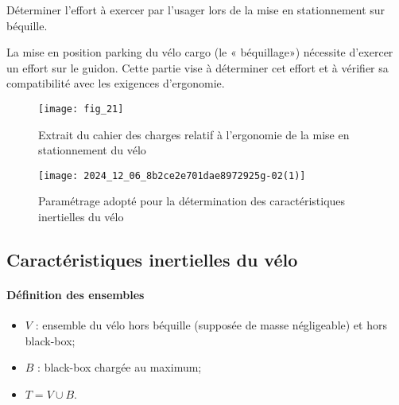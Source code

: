 \begin{obj}
Déterminer l'effort à exercer par l'usager lors de la mise en stationnement sur béquille.
\end{obj}

La mise en position parking du vélo cargo (le « béquillage») nécessite d'exercer un effort sur le guidon. Cette partie vise à déterminer cet effort et à vérifier sa compatibilité avec les exigences d'ergonomie.\\

\begin{figure}[!htb]
\begin{center}
\texttt{[image: fig\_21]}
\caption{Extrait du cahier des charges relatif à l'ergonomie de la mise en stationnement du vélo\\ \label{fig2.1}}
\end{center}
\end{figure}

\begin{figure}[!htb]
\begin{center}
\texttt{[image: 2024\_12\_06\_8b2ce2e701dae8972925g-02(1)]}
\caption{Paramétrage adopté pour la détermination des caractéristiques inertielles du vélo \label{fig2.2}}
\end{center}
\end{figure}
\fi


\subsection{Caractéristiques inertielles du vélo}
\ifprof
\else

\paragraph*{Définition des ensembles}
\begin{itemize}
  \item \(V\) : ensemble du vélo hors béquille (supposée de masse négligeable) et hors black-box;
  \item \(B\) : black-box chargée au maximum;
  \item \(T=V \cup B\).
\end{itemize}

